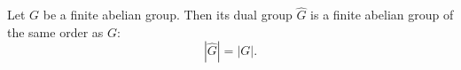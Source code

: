 Let $G$ be a finite abelian group. Then its dual group $\widehat{G}$ is a finite abelian group of the same order as $G$:
$$|\widehat{G}| = |G|.$$

